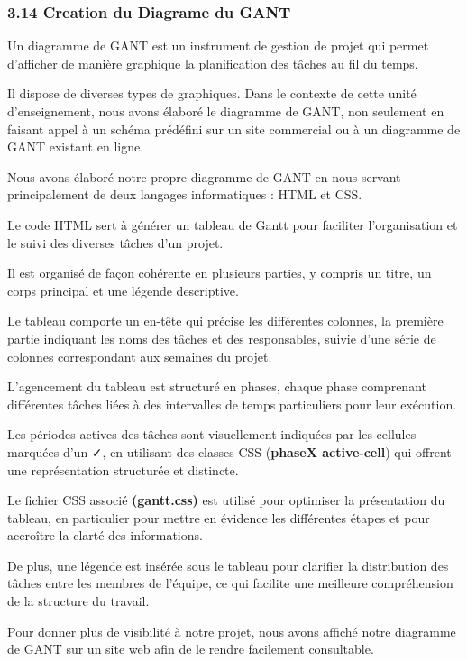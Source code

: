 \documentclass[
]{article}
\begin{document}
\subsubsection{3.14 Creation du Diagrame du
GANT}\label{creation-du-diagrame-du-gant}

Un diagramme de GANT est un instrument de gestion de projet qui permet
d'afficher de manière graphique la planification des tâches au fil du
temps.

Il dispose de diverses types de graphiques. Dans le contexte de cette
unité d'enseignement, nous avons élaboré le diagramme de GANT, non
seulement en faisant appel à un schéma prédéfini sur un site commercial
ou à un diagramme de GANT existant en ligne.

Nous avons élaboré notre propre diagramme de GANT en nous servant
principalement de deux langages informatiques : HTML et CSS.

Le code HTML sert à générer un tableau de Gantt pour faciliter
l'organisation et le suivi des diverses tâches d'un projet.

Il est organisé de façon cohérente en plusieurs parties, y compris un
titre, un corps principal et une légende descriptive.

Le tableau comporte un en-tête qui précise les différentes colonnes, la
première partie indiquant les noms des tâches et des responsables,
suivie d'une série de colonnes correspondant aux semaines du projet.

L'agencement du tableau est structuré en phases, chaque phase comprenant
différentes tâches liées à des intervalles de temps particuliers pour
leur exécution.

Les périodes actives des tâches sont visuellement indiquées par les
cellules marquées d'un ✓, en utilisant des classes CSS (\textbf{phaseX
active-cell}) qui offrent une représentation structurée et distincte.

Le fichier CSS associé \textbf{(gantt.css)} est utilisé pour optimiser
la présentation du tableau, en particulier pour mettre en évidence les
différentes étapes et pour accroître la clarté des informations.

De plus, une légende est insérée sous le tableau pour clarifier la
distribution des tâches entre les membres de l'équipe, ce qui facilite
une meilleure compréhension de la structure du travail.

Pour donner plus de visibilité à notre projet, nous avons affiché notre
diagramme de GANT sur un site web afin de le rendre facilement
consultable.
\end{document}

